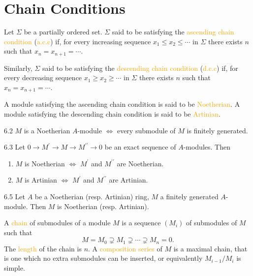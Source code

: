 \chapter{Chain Conditions}

Let $\Sigma$ be a partially ordered set. $\Sigma$ said to be satisfying the \textcolor{orange}{ascending chain condition} (\textcolor{orange}{a.c.c}) if, for every increasing sequence $x_1\leqslant x_2\leqslant\cdots$ in $\Sigma$ there exists $n$ such that $x_n=x_{n+1}=\cdots$.

Similarly, $\Sigma$ said to be satisfying the \textcolor{orange}{descending chain condition} (\textcolor{orange}{d.c.c}) if, for every decreasing sequence $x_1\geqslant x_2\geqslant\cdots$ in $\Sigma$ there exists $n$ such that $x_n=x_{n+1}=\cdots$.

A module satisfying the ascending chain condition is said to be \textcolor{orange}{Noetherian}. A module satisfying the descending chain condition is said to be \textcolor{orange}{Artinian}.

\begin{proposition}{6.2}
	$M$ is a Noetherian $A$-module $\Leftrightarrow$ every submodule of $M$ is finitely generated.
\end{proposition}

\begin{proposition}{6.3}
	Let $0\rightarrow M^\prime\rightarrow M\rightarrow M^{\prime\prime}\rightarrow0$ be an exact sequence of $A$-modules. Then
	\begin{enumerate}[label=\textup{(\roman*)}]
		\item $M$ is Noetherian $\Leftrightarrow$ $M^\prime$ and $M^{\prime\prime}$ are Noetherian.
		\item $M$ is Artinian $\Leftrightarrow$ $M^\prime$ and $M^{\prime\prime}$ are Artinian.
	\end{enumerate}
\end{proposition}

\begin{proposition}{6.5}
	Let $A$ be a Noetherian (resp. Artinian) ring, $M$ a finitely generated $A$-module. Then $M$ is Noetherian (resp. Artinian).
\end{proposition}

\begin{definition}
	A \textcolor{orange}{chain} of submodules of a module $M$ is a sequence $\left(M_i\right)$ of submodules of $M$ such that
	\begin{equation*}
		M=M_0\supsetneq M_1\supsetneq\cdots\supsetneq M_n=0.
	\end{equation*}
	The \textcolor{orange}{length} of the chain is $n$. A \textcolor{orange}{composition series} of $M$ is a maximal chain, that is one which no extra submodules can be inserted, or equivalently $M_{i-1}/M_i$ is simple.
\end{definition}

